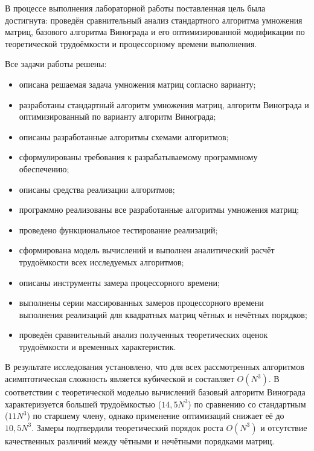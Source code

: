 
В процессе выполнения лабораторной работы поставленная цель была достигнута: проведён сравнительный анализ стандартного алгоритма умножения матриц, базового алгоритма Винограда и его оптимизированной модификации по теоретической трудоёмкости и процессорному времени выполнения.

Все задачи работы решены:
\begin{itemize}
    \item описана решаемая задача умножения матриц согласно варианту;
    \item разработаны стандартный алгоритм умножения матриц, алгоритм Винограда и оптимизированный по варианту алгоритм Винограда;
    \item описаны разработанные алгоритмы схемами алгоритмов;
    \item сформулированы требования к разрабатываемому программному обеспечению;
    \item описаны средства реализации алгоритмов;
    \item программно реализованы все разработанные алгоритмы умножения матриц;
    \item проведено функциональное тестирование реализаций;
    \item сформирована модель вычислений и выполнен аналитический расчёт трудоёмкости всех исследуемых алгоритмов;
    \item описаны инструменты замера процессорного времени;
    \item выполнены серии массированных замеров процессорного времени выполнения реализаций для квадратных матриц чётных и нечётных порядков;
    \item проведён сравнительный анализ полученных теоретических оценок трудоёмкости и временных характеристик.
\end{itemize}
В результате исследования установлено, что для всех рассмотренных алгоритмов асимптотическая сложность является кубической и составляет $O(N^3)$. В соответствии с теоретической моделью вычислений базовый алгоритм Винограда характеризуется большей трудоёмкостью ($14{,}5N^3$) по сравнению со стандартным ($11N^3$) по старшему члену, однако применение оптимизаций снижает её до $10{,}5N^3$. Замеры подтвердили теоретический порядок роста $O(N^3)$ и отсутствие качественных различий между чётными и нечётными порядками матриц.
